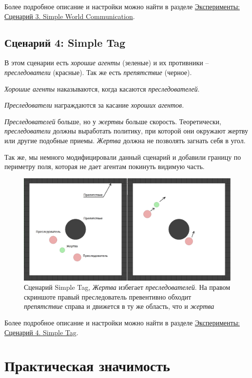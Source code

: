 Более подробное описание и настройки можно найти в разделе \hyperref[exp-swc]{Эксперименты: Сценарий 3. Simple World Communication}.

\subsection{Сценарий 4: Simple Tag} \label{intro-st}

В этом сценарии есть \textit{хорошие агенты} (зеленые) и их противники – \textit{преследователи} (красные). Так же есть \textit{препятствие} (черное).

\textit{Хорошие агенты} наказываются, когда касаются \textit{преследователей}.

\textit{Преследователи} награждаются за касание \textit{хороших агентов}.

\textit{Преследователей} больше, но у \textit{жертвы} больше скорость. Теоретически, \textit{преследователи} должны выработать политику, при которой они окружают жертву или другие подобные приемы. \textit{Жертва} должна не позволять загнать себя в угол.

Так же, мы немного модифицировали данный сценарий и добавили границу по периметру поля, которая не дает агентам покинуть видимую часть.

\begin{figure}[ht!] 
	\center
	\includegraphics [scale=0.41] {my_folder/images/st.png}
	\caption{Сценарий Simple Tag, \textit{Жертва} избегает \textit{преследователей}. На правом скриншоте правый преследователь превентивно обходит \textit{препятствие} справа и движется в ту же область, что и \textit{жертва}}
	\label{fig:st}  
\end{figure}

Более подробное описание и настройки можно найти в разделе \hyperref[exp-st]{Эксперименты: Сценарий 4. Simple Tag}.

\section{Практическая значимость} \label{intro:sec3}

